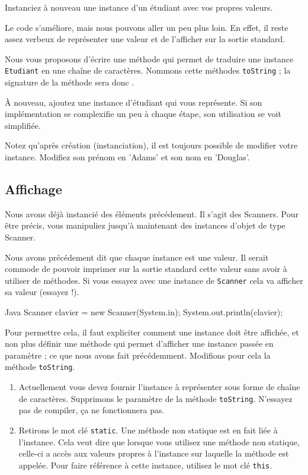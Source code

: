 \documentclass[a4paper,11pt]{article}
\begin{document}

	Instanciez à nouveau une instance d'un étudiant avec vos propres valeurs.

	\bigskip

	Le code s'améliore, mais nous pouvons aller un peu plus loin. En effet, il reste assez verbeux de représenter une valeur et de l'afficher sur la sortie standard.

	Nous vous proposons d'écrire une méthode qui permet de \og traduire\fg{} une instance \texttt{Etudiant} en une chaîne de caractères. Nommons cette méthodes \texttt{toString} ; la signature de la méthode sera donc .


	À nouveau, ajoutez une instance d'étudiant qui vous représente. Si son implémentation se complexifie un peu à chaque étape, son utilisation se voit simplifiée.

	Notez qu'après création (instanciation), il est toujours possible de modifier votre instance. Modifiez son prénom en 'Adams' et son nom en 'Douglas'.


	\subsection{Affichage}

	Nous avons déjà instancié des éléments précédement. Il s'agit des Scanners. Pour être précis, vous manipuliez jusqu'à maintenant des instances d'objet de type Scanner.

	Nous avons précédement dit que chaque instance est une valeur. Il serait commode de pouvoir imprimer sur la sortie standard cette valeur sans avoir à utiliser de méthodes. Si vous essayez avec une instance de \texttt{Scanner} cela va afficher sa valeur (essayez !).
	\begin{Code}{Java}
		Scanner clavier = new Scanner(System.in);
		System.out.println(clavier);
	\end{Code}

	Pour permettre cela, il faut expliciter comment une instance doit être affichée, et non plus définir une méthode qui permet d'afficher une instance passée en paramètre ; ce que nous avons fait précédemment. Modifions pour cela la méthode \texttt{toString}. 
	\begin{enumerate}
		\item Actuellement vous devez fournir l'instance à représenter sous forme de chaîne de caractères. Supprimons le paramètre de la méthode \texttt{toString}. N'essayez pas de compiler, ça ne fonctionnera pas.
		\item Retirons le mot clé \texttt{static}. Une méthode non statique est en fait liée à l'instance. Cela veut dire que lorsque vous utilisez une méthode non statique, celle-ci a accès aux valeurs propres à l'instance sur laquelle la méthode est appelée. Pour faire référence à cette instance, utilisez le mot clé \texttt{this}.
	\end{enumerate} 
\end{document}
